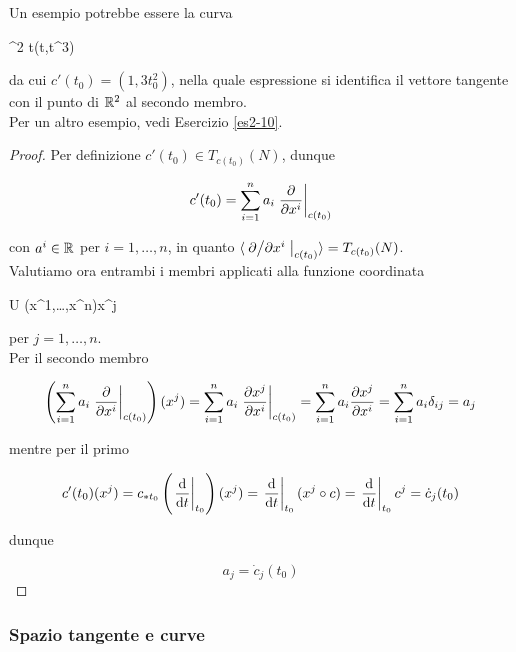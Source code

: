 Un esempio potrebbe essere la curva

	{\R}{\R^{2}}
	{t}{(t,t^{3})}

da cui $ c'(t_{0}) = (1, 3 t_{0}^{2}) $, nella quale espressione si identifica il vettore tangente con il punto di $ \mathbb{R}^{2} $ al secondo membro.\\
Per un altro esempio, vedi Esercizio \ref{es2-10}.

\begin{proof}
	Per definizione $ c'(t_{0}) \in T_{c(t_{0})}(N) $, dunque
	
	\begin{equation}
		c'(t_{0}) = \sum_{i=1}^{n} a_{i} \eval{ \pdv{x^{i}} }_{c(t_{0})}
	\end{equation}

	con $ a^{i} \in \mathbb{R} $ per $ i=1,\dots,n $, in quanto $ \langle \eval{ \pdv*{x^{i}} }_{c(t_{0})} \rangle = T_{c(t_{0})}(N) $.\\
	Valutiamo ora entrambi i membri applicati alla funzione coordinata
	
		{U}{\R}
		{(x^{1},\dots,x^{n})}{x^{j}}

	per $ j=1,\dots,n $.\\
	Per il secondo membro
	
	\begin{equation}
		\left( \sum_{i=1}^{n} a_{i} \eval{ \pdv{x^{i}} }_{c(t_{0})} \right) (x^{j}) = \sum_{i=1}^{n} a_{i} \eval{ \pdv{x^{j}}{x^{i}} }_{c(t_{0})} %
		= \sum_{i=1}^{n} a_{i} \pdv{x^{j}}{x^{i}} %
		= \sum_{i=1}^{n} a_{i} \delta_{ij} %
		= a_{j}
	\end{equation}

	mentre per il primo
	
	\begin{equation}
		c'(t_{0})(x^{j}) = c_{*t_{0}} \left( \eval{ \dv{t} }_{t_{0}} \right)(x^{j}) %
		= \eval{ \dv{t} }_{t_{0}} (x^{j} \circ c) %
		= \eval{ \dv{t} }_{t_{0}} c^{j} %
		= \dot{c}_{j}(t_{0})
	\end{equation}

	dunque
	
	\begin{equation}
		a_{j} = \dot{c}_{j}(t_{0})
	\end{equation}
\end{proof}

\subsubsection{Spazio tangente e curve}

